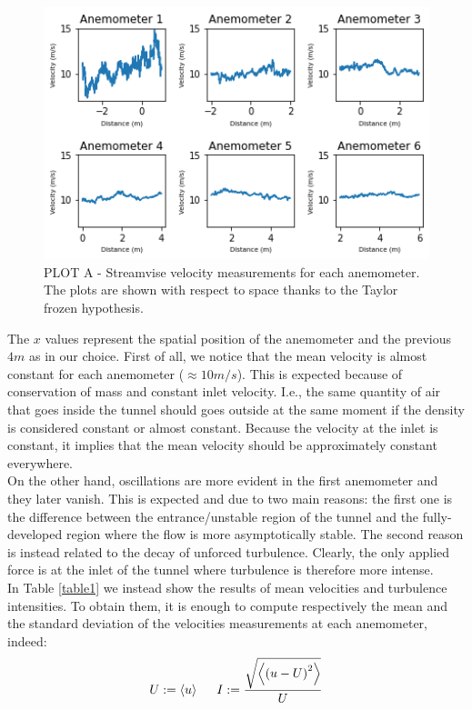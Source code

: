 \documentclass[11pt,titlepage]{article}
\begin{document}
	\begin{center}
	\begin{figure} [h]
		\centering
		\includegraphics[width = 4.5in]{./figures/ex1_1.png}
		\caption{PLOT A - Streamvise velocity measurements for each anemometer. The plots are shown with respect to space thanks to the Taylor frozen hypothesis.}
		\label{fig1}
	\end{figure}
\end{center}

The $x$ values represent the spatial position of the anemometer and the previous $4m$ as in our choice. First of all, we notice that the mean velocity is almost constant for each anemometer ($\approx 10m/s$). This is expected because of conservation of mass and constant inlet velocity. I.e., the same quantity of air that goes inside the tunnel should goes outside at the same moment if the density is considered constant or almost constant. Because the velocity at the inlet is constant, it implies that the mean velocity should be approximately constant everywhere. \\
On the other hand, oscillations are more evident in the first anemometer and they later vanish. This is expected and due to two main reasons: the first one is the difference between the entrance/unstable region of the tunnel and the fully-developed region where the flow is more asymptotically stable. The second reason is instead related to the decay of unforced turbulence. Clearly, the only applied force is at the inlet of the tunnel where turbulence is therefore more intense. \\
In Table \ref{table1} we instead show the results of mean velocities and turbulence intensities. To obtain them, it is enough to compute respectively the mean and the standard deviation of the velocities measurements at each anemometer, indeed:
\begin{equation*}
	U:=\left<u\right> \hspace{5mm}	I := \frac{\sqrt{\left<\left(u-U\right)^2\right>}}{U}
\end{equation*}
\end{document}
